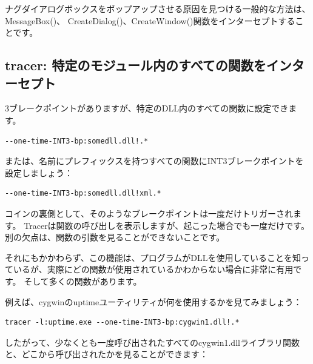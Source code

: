 ナグダイアログボックスをポップアップさせる原因を見つける一般的な方法は、MessageBox()、
CreateDialog()、CreateWindow()関数をインターセプトすることです。

\subsection{tracer: 特定のモジュール内のすべての関数をインターセプト}

3ブレークポイントがありますが、特定のDLL内のすべての関数に設定できます。

\begin{lstlisting}
--one-time-INT3-bp:somedll.dll!.*
\end{lstlisting}

または、名前にプレフィックスを持つすべての関数にINT3ブレークポイントを設定しましょう：

\begin{lstlisting}
--one-time-INT3-bp:somedll.dll!xml.*
\end{lstlisting}

コインの裏側として、そのようなブレークポイントは一度だけトリガーされます。
Tracerは関数の呼び出しを表示しますが、起こった場合でも一度だけです。
別の欠点は、関数の引数を見ることができないことです。

それにもかかわらず、この機能は、プログラムがDLLを使用していることを知っているが、実際にどの関数が使用されているかわからない場合に非常に有用です。
そして多くの関数があります。

\par
{}
例えば、cygwinのuptimeユーティリティが何を使用するかを見てみましょう：

\begin{lstlisting}
tracer -l:uptime.exe --one-time-INT3-bp:cygwin1.dll!.*
\end{lstlisting}

したがって、少なくとも一度呼び出されたすべてのcygwin1.dllライブラリ関数と、どこから呼び出されたかを見ることができます：

